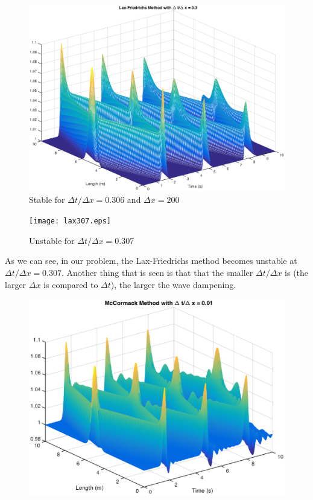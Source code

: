 \begin{figure}
\begin{center}
\includegraphics[scale=0.6]{lax03.eps}
\caption{Stable for $\Delta t/ \Delta x=0.306$ and $\Delta x = 200$}
\label{reg}
\end{center}
\end{figure}

\begin{figure}
\begin{center}
\texttt{[image: lax307.eps]}
\caption{Unstable for $\Delta t /\Delta x=0.307$}
\label{reg}
\end{center}
\end{figure}

As we can see, in our problem, the Lax-Friedrichs method becomes unstable at $\Delta t/\Delta x=0.307$. Another thing that is seen is that that the smaller $\Delta t/\Delta x$ is (the larger $\Delta x$ is compared to $\Delta t$), the larger the wave dampening. 

\FloatBarrier
\begin{figure}
\begin{center}
\includegraphics[scale=0.6]{mccormack001.eps}
\label{reg}
\end{center}
\end{figure}

